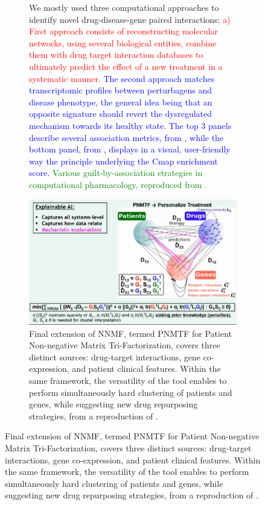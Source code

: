 \begin{figure}
\begin{subfigure}[p]{0.8\textwidth}
         \caption[\textbf{Main computational repositioning strategies implemented in internal Patrimony computational platform.}]{We mostly used three computational approaches to identify novel drug-disease-gene paired interactions: \textcolor{red}{a) First approach consists of reconstructing molecular networks, using several biological entities, combine them with drug target interaction databases to ultimately predict the effect of a new treatment in a systematic manner. \textcolor{blue}{The second approach matches transcriptomic profiles between perturbagens and disease phenotype, the general idea being that an opposite signature should revert the dysregulated mechanism towards its healthy state. The top 3 panels describe several association metrics, from \autocite[Fig.1]{zhao_rhee23}, while the bottom panel, from \autocite[Fig.1]{musa_etal17}, displays in a visual, user-friendly way the principle underlying the Cmap enrichment score.} \textcolor{green}{Various guilt-by-association strategies in computational pharmacology, reproduced from \autocite[Fig.3]{hodos_etal16}.}}}
\label{subfig:repositioning-strategies}
     \end{subfigure}
     \begin{subfigure}[b]{0.4\textwidth}
         \centering
         \includegraphics[width=\textwidth]{figures/repurposing/icell_extended_framework.png}
         \caption[\textbf{NNMF extended to integrate multiple entities.}]{Final extension of NNMF, termed PNMTF for Patient Non-negative Matrix Tri-Factorization, covers three distinct sources: drug-target interactions, gene co-expression, and patient clinical features. Within the same framework, the versatility of the tool enables to perform simultaneously hard clustering of patients and genes, while suggesting new drug repurposing strategies, from a reproduction of \autocite{malod-dognin_etal23}.}

\end{subfigure}
\end{figure}
